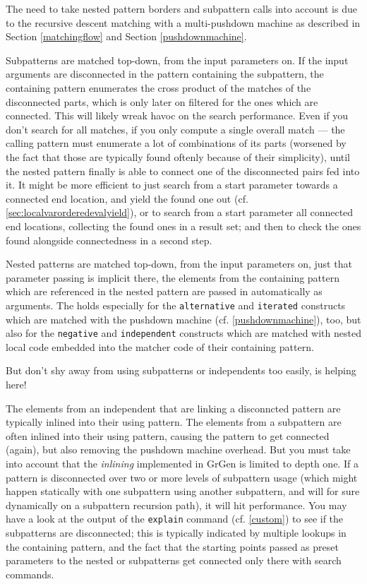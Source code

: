 The need to take nested pattern borders and subpattern calls into account is due to the recursive descent matching with a multi-pushdown machine as described in Section \ref{matchingflow} and Section \ref{pushdownmachine}.

Subpatterns are matched top-down, from the input parameters on.
If the input arguments are disconnected in the pattern containing the subpattern, the containing pattern enumerates the cross product of the matches of the disconnected parts, which is only later on filtered for the ones which are connected.
This will likely wreak havoc on the search performance.
Even if you don't search for all matches, if you only compute a single overall match --- the calling pattern must enumerate a lot of combinations of its parts (worsened by the fact that those are typically found oftenly because of their simplicity), until the nested pattern finally is able to connect one of the disconnected pairs fed into it.
It might be more efficient to just search from a start parameter towards a connected end location, and yield the found one out (cf. \ref{sec:localvarorderedevalyield}), or to search from a start parameter all connected end locations, collecting the found ones in a result set; and then to check the ones found alongside connectedness in a second step.

Nested patterns are matched top-down, from the input parameters on, just that parameter passing is implicit there, the elements from the containing pattern which are referenced in the nested pattern are passed in automatically as arguments.
The holds especially for the \texttt{alternative} and \texttt{iterated} constructs which are matched with the pushdown machine (cf. \ref{pushdownmachine}), too, but also for the \texttt{negative} and \texttt{independent} constructs which are matched with nested local code embedded into the matcher code of their containing pattern.

But don't shy away from using subpatterns or independents too easily,  is helping here!

The elements from an independent that are linking a disconncted pattern are typically inlined into their using pattern.
The elements from a subpattern are often inlined into their using pattern, causing the pattern to get connected (again), 
but also removing the pushdown machine overhead.
But you must take into account that the \emph{inlining} implemented in GrGen is limited to depth one.
If a pattern is disconnected over two or more levels of subpattern usage (which might happen statically with one subpattern using another subpattern, and will for sure dynamically on a subpattern recursion path), it will hit performance.
You may have a look at the output of the \texttt{explain} command (cf. \ref{custom}) to see if the subpatterns are disconnected; this is typically indicated by multiple lookups in the containing pattern, and the fact that the starting points passed as preset parameters to the nested or subpatterns get connected only there with search commands.


